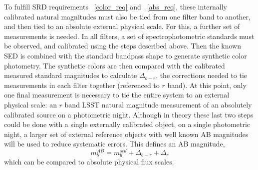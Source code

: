 \documentclass[12pt,preprint]{aastex}
\begin{document}
To fulfill SRD requirements ~\ref{color_req} and ~\ref{abs_req}, these
internally calibrated natural magnitudes must also be tied from one filter
band to another, and then tied to an absolute external physical scale.
For this, a further set of measurements is needed. In all filters, a
set of spectrophotometric standards must be observed, and calibrated using
the steps described above. Then the known SED is combined with
the standard bandpass shape to generate synthetic color
photometry. The synthetic colors are then compared with the
calibrated measured standard magnitudes to calculate $\Delta_{b-r}$,
the corrections needed to tie measurements in each filter together
(referenced to $r$ band).  At this point, only one final measurement
is necessary to tie the entire system to an external physical scale:
an $r$ band LSST natural magnitude measurement of an absolutely
calibrated source on a photometric night. Although in theory these
last two steps could be done with a single externally calibrated
object, on a single photometric night, a larger set of external
reference objects with well known AB magnitudes will be used to reduce
systematic errors. This defines an AB magnitude,
\begin{equation}
\label{eqn:extmags}
m_b^{AB} = m_b^{std}  + \Delta_{b-r} + \Delta_r
\end{equation}
which can be compared to absolute physical flux scales. 
\end{document}
